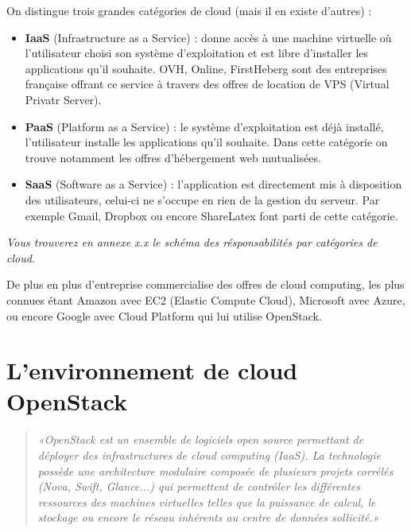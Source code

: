 \documentclass{report}
\begin{document}
    On distingue trois grandes catégories de cloud (mais il en existe d'autres) :\vspace{2 mm}
    \begin{itemize}
        \item \textbf{IaaS} (Infrastructure as a Service) : donne accès à une machine virtuelle où l'utilisateur choisi son système d'exploitation et est libre d'installer les applications qu'il souhaite. OVH, Online, FirstHeberg sont des entreprises française offrant ce service à travers des offres de location de VPS (Virtual Privatr Server).\vspace{2 mm}
        \item \textbf{PaaS} (Platform as a Service) : le système d'exploitation est déjà installé, l'utilisateur installe les applications qu'il souhaite. Dans cette catégorie on trouve notamment les offres d'hébergement web mutualisées.\vspace{2 mm}
        \item \textbf{SaaS} (Software as a Service) : l'application est directement mis à disposition des utilisateurs, celui-ci ne s'occupe en rien de la gestion du serveur. Par exemple Gmail, Dropbox ou encore ShareLatex font parti de cette catégorie.
    \end{itemize}\vspace{2 mm}
    \textit{Vous trouverez en annexe x.x le schéma des résponsabilités par catégories de cloud.} %
    \bigbreak
    
    
    
     De plus en plus d'entreprise commercialise des offres de cloud computing, les plus connues étant Amazon avec EC2 (Elastic Compute Cloud), Microsoft avec Azure, ou encore Google avec Cloud Platform qui lui utilise OpenStack.
    \bigbreak
    
    \section{L'environnement de cloud OpenStack}

        \begin{quote}
            \textit{«OpenStack est un ensemble de logiciels open source permettant de déployer des infrastructures de cloud computing (IaaS). La technologie possède une architecture modulaire composée de plusieurs projets corrélés (Nova, Swift, Glance...) qui permettent de contrôler les différentes ressources des machines virtuelles telles que la puissance de calcul, le stockage ou encore le réseau inhérents au centre de données sollicité.»
            \cite{wiki_openstack}}
        \end{quote}
        
\end{document}
